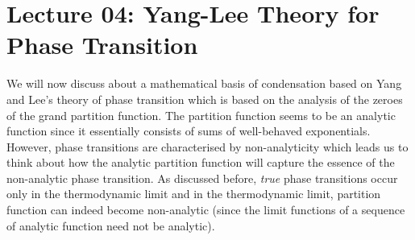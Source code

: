 \section*{Lecture 04: Yang-Lee Theory for Phase Transition}
We will now discuss about a mathematical basis of condensation based on Yang and Lee's theory of phase transition \cite{YangLee} which is based on the analysis of the zeroes of the grand partition function. The partition function seems to be an analytic function since it essentially consists of sums of well-behaved exponentials. \\[0.2cm]
However, phase transitions are characterised by non-analyticity which leads us to think about how the analytic partition function will capture the essence of the non-analytic phase transition. As discussed before, \textit{true} phase transitions occur only in the thermodynamic limit and in the thermodynamic limit, partition function can indeed become non-analytic (since the limit functions of a sequence of analytic function need not be analytic).
